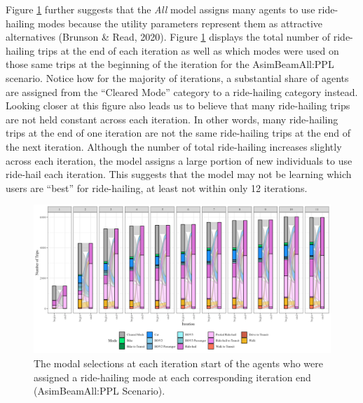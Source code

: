 \documentclass[simple, masters, twoside]{byuthesis}
\begin{document}
Figure \ref{fig:sankey2} further suggests that the \emph{All} model assigns many agents to use ride-hailing modes because the utility parameters represent them as attractive alternatives (Brunson \& Read, 2020). Figure \ref{fig:sankey2} displays the total number of ride-hailing trips at the end of each iteration as well as which modes were used on those same trips at the beginning of the iteration for the AsimBeamAll:PPL scenario. Notice how for the majority of iterations, a substantial share of agents are assigned from the ``Cleared Mode'' category to a ride-hailing category instead. Looking closer at this figure also leads us to believe that many ride-hailing trips are not held constant across each iteration. In other words, many ride-hailing trips at the end of one iteration are not the same ride-hailing trips at the end of the next iteration. Although the number of total ride-hailing increases slightly across each iteration, the model assigns a large portion of new individuals to use ride-hail each iteration. This suggests that the model may not be learning which users are ``best'' for ride-hailing, at least not within only 12 iterations.

\begin{figure}

\centering
\includegraphics[width = 1.05\paperwidth]{planshifts_facet.png}
\caption[Trips that switch to ride-hail by iteration.]{The modal selections at each iteration start of the agents who were assigned a ride-hailing mode at each corresponding iteration end (AsimBeamAll:PPL Scenario).}
\label{fig:sankey2}

\end{figure}
\end{document}
